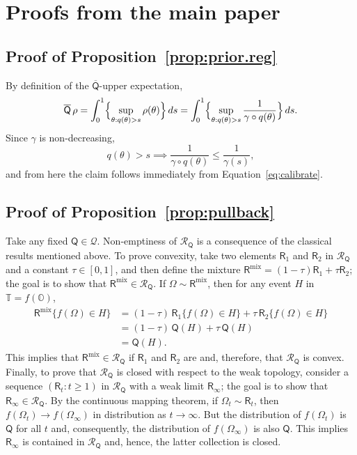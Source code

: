 \documentclass[a4paper, 12pt]{article}
\theoremstyle{plain}
\theoremstyle{definition}
\theoremstyle{remark}
\newcommand{\OO}{\mathbb{O}}
\newcommand{\TT}{\mathbb{T}}
\newcommand{\prior}{\mathsf{Q}}
\newcommand{\credal}{\mathscr{Q}}
\newcommand{\pbcred}{\mathscr{R}}
\newcommand{\pb}{\mathsf{R}}
\newcommand{\uprior}{\overline{\mathsf{Q}}}
\begin{document}
\section{Proofs from the main paper}

\subsection{Proof of Proposition~\ref{prop:prior.reg}}

By definition of the $\uprior$-upper expectation, 
\[ \uprior \, \rho = \int_0^1 \Bigl\{ \sup_{\theta: q(\theta) > s} \rho(\theta) \Bigr\} \, ds = \int_0^1 \Bigl\{ \sup_{\theta: q(\theta) > s} \frac{1}{\gamma \circ q(\theta)} \Bigr\} \, ds. \]
Since $\gamma$ is non-decreasing, 
\[ q(\theta) > s \implies \frac{1}{\gamma \circ q(\theta)} \leq \frac{1}{\gamma(s)}, \]
and from here the claim follows immediately from Equation~\eqref{eq:calibrate}.  


\subsection{Proof of Proposition~\ref{prop:pullback}}

Take any fixed $\prior \in \credal$.  Non-emptiness of $\pbcred_\prior$ is a consequence of the classical results mentioned above.  To prove convexity, take two elements $\pb_1$ and $\pb_2$ in $\pbcred_\prior$ and a constant $\tau \in [0,1]$, and then define the mixture $\pb^\text{mix} = (1-\tau) \pb_1 + \tau \pb_2$; the goal is to show that $\pb^\text{mix} \in \pbcred_\prior$.  If $\Omega \sim \pb^\text{mix}$, then for any event $H$ in $\TT = f(\OO)$, 
\begin{align*}
\pb^\text{mix}\{ f(\Omega) \in H \} & = (1-\tau) \, \pb_1\{ f(\Omega) \in H\} + \tau \, \pb_2\{ f(\Omega) \in H \} \\
& = (1-\tau) \, \prior(H) + \tau \, \prior(H) \\
& = \prior(H).
\end{align*}
This implies that $\pb^\text{mix} \in \pbcred_\prior$ if $\pb_1$ and $\pb_2$ are and, therefore, that $\pbcred_\prior$ is convex.  Finally, to prove that $\pbcred_\prior$ is closed with respect to the weak topology, consider a sequence $(\pb_t: t \geq 1)$ in $\pbcred_\prior$ with a weak limit $\pb_\infty$; the goal is to show that $\pb_\infty \in \pbcred_\prior$.  By the continuous mapping theorem, if $\Omega_t \sim \pb_t$, then $f(\Omega_t) \to f(\Omega_\infty)$ in distribution as $t \to \infty$.  But the distribution of $f(\Omega_t)$ is $\prior$ for all $t$ and, consequently, the distribution of $f(\Omega_\infty)$ is also $\prior$.  This implies $\pb_\infty$ is contained in $\pbcred_\prior$ and, hence, the latter collection is closed. 
\end{document}
